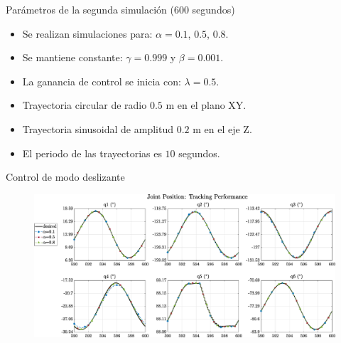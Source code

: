 \documentclass[10pt]{beamer} %
\begin{document}
	
	
	\begin{frame}[fragile]{Parámetros de la segunda simulación ($600$ segundos)}
		\begin{minipage}{\textwidth}
			\large {} 
			\begin{itemize}
				\item Se realizan simulaciones para: $\alpha=0.1$, $0.5$, $0.8$.
				
				\item Se mantiene constante: $\gamma=0.999$ y $\beta=0.001$.
				
				\item La ganancia de control se inicia con: $\lambda=0.5$.
			\end{itemize}
			\color{white}{para crear espacio, borrar luego}	 
		\end{minipage}
		
		\begin{minipage}{\textwidth}		
			\large {}
			\begin{itemize}
				\item Trayectoria circular de radio $0.5$ m en el plano XY.
				
				\item Trayectoria sinusoidal de amplitud $0.2$ m en el eje Z.
				
				\item El periodo de las trayectorias es $10$ segundos.
			\end{itemize}
		\end{minipage}		
	\end{frame}	
	
	
	
	\begin{frame}[fragile]{Control de modo deslizante}
		\begin{figure}
			\centering
			\hspace*{-0.7cm}\includegraphics[width=1.1\textwidth]{img/SMCi/circular_traj/600_seg/articular_SMCi_position_compare.eps}
		\end{figure}
	\end{frame}
	
\end{document}

